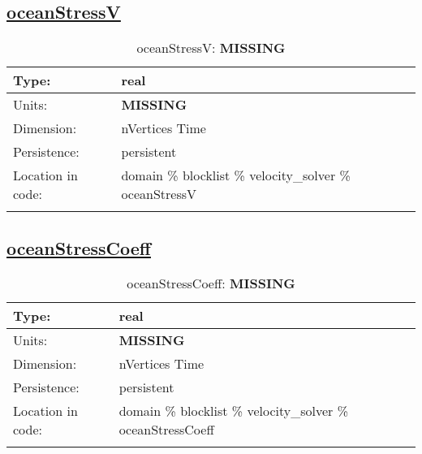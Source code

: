 \subsection[oceanStressV]{\hyperref[sec:var_tab_velocity_solver]{oceanStressV}}
\label{subsec:var_sec_velocity_solver_oceanStressV}
\begin{center}
\begin{longtable}{| p{2.0in} | p{4.0in} |}
        \hline 
        Type: & real \\
        \hline 
        Units: & {\bf \color{red} MISSING} \\
        \hline 
        Dimension: & nVertices Time \\
        \hline 
        Persistence: & persistent \\
        \hline 
         Location in code: & domain \% blocklist \% velocity\_solver \% oceanStressV \\
         \hline 
    \caption{oceanStressV: {\bf \color{red} MISSING}}
\end{longtable}
\end{center}
\subsection[oceanStressCoeff]{\hyperref[sec:var_tab_velocity_solver]{oceanStressCoeff}}
\label{subsec:var_sec_velocity_solver_oceanStressCoeff}
\begin{center}
\begin{longtable}{| p{2.0in} | p{4.0in} |}
        \hline 
        Type: & real \\
        \hline 
        Units: & {\bf \color{red} MISSING} \\
        \hline 
        Dimension: & nVertices Time \\
        \hline 
        Persistence: & persistent \\
        \hline 
         Location in code: & domain \% blocklist \% velocity\_solver \% oceanStressCoeff \\
         \hline 
    \caption{oceanStressCoeff: {\bf \color{red} MISSING}}
\end{longtable}
\end{center}
